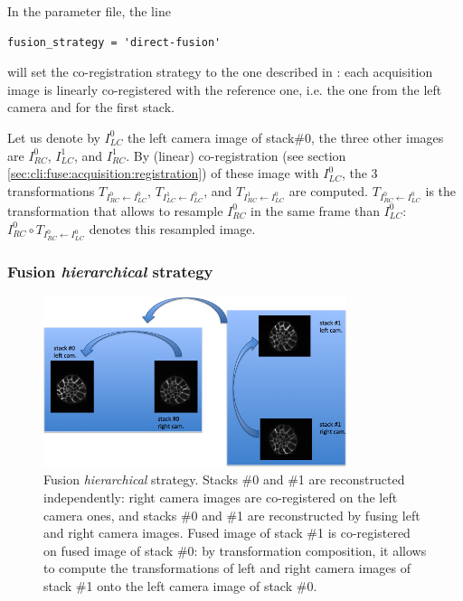 In the parameter file, the line
\begin{verbatim}
fusion_strategy = 'direct-fusion'
\end{verbatim}
will set the co-registration strategy to the one described in \cite{guignard:tel-01278725,guignard:hal-01938126}: each acquisition image is linearly co-registered with the reference one, i.e. the one from the left camera and for the first stack.

Let us denote by $I^{0}_{LC}$ the left camera image of stack\#0, the three other images are $I^{0}_{RC}$, $I^{1}_{LC}$, and $I^{1}_{RC}$. By (linear) co-registration (see section \ref{sec:cli:fuse:acquisition:registration}) of these image with $I^{0}_{LC}$, the 3 transformations
$T_{I^{0}_{RC} \leftarrow I^{0}_{LC}}$,
$T_{I^{1}_{LC} \leftarrow I^{0}_{LC}}$, and
$T_{I^{1}_{RC} \leftarrow I^{0}_{LC}}$
are computed.
$T_{I^{0}_{RC} \leftarrow I^{0}_{LC}}$ is the transformation that allows to resample $I^{0}_{RC}$ in the same frame than $I^{0}_{LC}$:
$I^{0}_{RC} \circ T_{I^{0}_{RC} \leftarrow I^{0}_{LC}}$ denotes this resampled image.


\subsubsection{Fusion \textit{hierarchical} strategy}

\begin{figure}
\begin{center}
\includegraphics[height=50mm]{figures/fusion-hierarchical-strategy.png}  
\end{center}
\caption{\label{fig:cli:fuse:hierarchical:strategy} Fusion \textit{hierarchical} strategy. Stacks \#0 and \#1 are reconstructed independently: right camera images are co-registered on the left camera ones, and stacks \#0 and \#1 are reconstructed by fusing left and right camera images. Fused image of stack \#1 is co-registered on fused image of stack \#0: by transformation composition, it allows to compute the transformations of left and right camera images of stack \#1 onto the left camera image of stack \#0.}
\end{figure}

